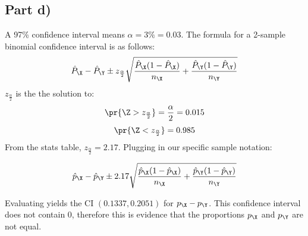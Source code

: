 \subsection{Part d)}

A 97\% confidence interval means $\alpha = 3\% = 0.03$. The formula for a 2-sample binomial confidence interval is as follows:
\[
\hat{P}_\X - \hat{P}_\Y \pm z_{\frac{\alpha}{2}} \sqrt{\frac{\hat{P}_\X(1 - \hat{P}_\X)}{n_\X} + \frac{\hat{P}_\Y(1 - \hat{P}_\Y)}{n_\Y}}
\]
$z_{\frac{\alpha}{2}}$ is the the solution to:
\[
\pr{\Z > z_{\frac{\alpha}{2}}} = \frac{\alpha}{2} = 0.015
\]
\[
\pr{\Z < z_{\frac{\alpha}{2}}} = 0.985
\]
From the stats table, $z_{\frac{\alpha}{2}} = 2.17$. Plugging in our specific sample notation:

\[
\hat{p}_\X - \hat{p}_\Y \pm 2.17 \sqrt{\frac{\hat{p}_\X(1 - \hat{p}_\X)}{n_\X} + \frac{\hat{p}_\Y(1 - \hat{p}_\Y)}{n_\Y}}
\]

Evaluating yields the CI $(0.1337, 0.2051)$ for $p_\X - p_\Y$.
This confidence interval does not contain 0, therefore this is evidence that the proportions $p_\X$ and $p_\Y$ are not equal.
